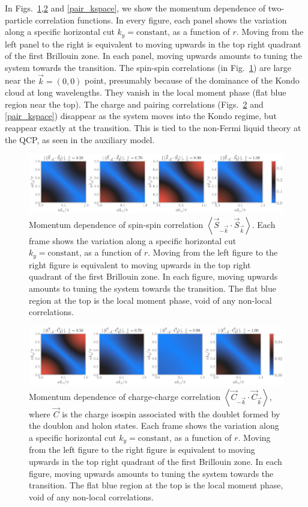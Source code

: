 \documentclass[reprint,hidelinks]{revtex4-2}
\begin{document}
In Figs.~\ref{spin_kspace},\ref{charge_kspace} and \ref{pair_kspace}, we show the momentum dependence of two-particle correlation functions. In every figure, each panel shows the variation along a specific horizontal cut \(k_y=\text{constant}\), as a function of \(r\). Moving from the left panel to the right is equivalent to moving upwards in the top right quadrant of the first Brillouin zone. In each panel, moving upwards amounts to tuning the system towards the transition. The spin-spin correlations (in Fig.~\ref{spin_kspace}) are large near the \(\vec k = \left( 0,0 \right) \) point, presumably because of the dominance of the Kondo cloud at long wavelengths. They vanish in the local moment phase (flat blue region near the top). The charge and pairing correlations (Figs.~\ref{charge_kspace} and \ref{pair_kspace}) disappear as the system moves into the Kondo regime, but reappear exactly at the transition. This is tied to the non-Fermi liquid theory at the QCP, as seen in the auxiliary model.
\begin{figure}[!htb]
\centering
\includegraphics[width=\textwidth]{spin_rspace_all.pdf}
\caption{Momentum dependence of spin-spin correlation \(\left<\vec{S}_{-\vec k}\cdot\vec{S}_{\vec k} \right>\). Each frame shows the variation along a specific horizontal cut \(k_y=\text{constant}\), as a function of \(r\). Moving from the left figure to the right figure is equivalent to moving upwards in the top right quadrant of the first Brillouin zone. In each figure, moving upwards amounts to tuning the system towards the transition. The flat blue region at the top is the local moment phase, void of any non-local correlations.}
\label{spin_kspace}
\end{figure}

\begin{figure}[!htb]
\centering
\includegraphics[width=\textwidth]{charge_rspace_all.pdf}
\caption{Momentum dependence of charge-charge correlation \(\left<\vec{C}_{-\vec k}\cdot\vec{C}_{\vec k} \right>\), where \(\vec C\) is the charge isospin associated with the doublet formed by the doublon and holon states. Each frame shows the variation along a specific horizontal cut \(k_y=\text{constant}\), as a function of \(r\). Moving from the left figure to the right figure is equivalent to moving upwards in the top right quadrant of the first Brillouin zone. In each figure, moving upwards amounts to tuning the system towards the transition. The flat blue region at the top is the local moment phase, void of any non-local correlations.}
\label{charge_kspace}
\end{figure}
\end{document}
